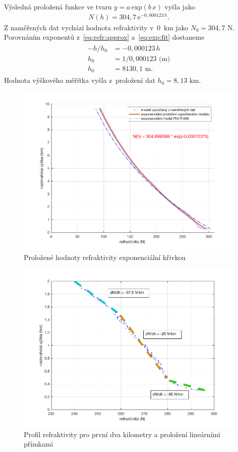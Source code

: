 \documentclass[twoside]{ctuthesis}
\newcommand{\mt}[1]{\text{#1}}
\theoremstyle{plain}
\theoremstyle{definition}
\theoremstyle{note}
\begin{document}
	Výsledná proložená funkce ve tvaru $y=a\,\mt{exp}(b\,x)$ vyšla jako
	\begin{align}
		N(h) = 304{,}7\,\mt{e}^{-0{,}000123\,h}.
		\label{eq:exp:fit}
	\end{align}
	Z naměřených dat vychází hodnota refraktivity v~0~km jako $N_\mt{0} = 304{,}7 \mt{ N}$. Porovnáním exponentů z~\eqref{eq:refr:approx} a~\eqref{eq:exp:fit} dostaneme
	\begin{align}
		\begin{split}
		-h/h_\mt{0} &= -0{,}000123\,h\\
		h_\mt{0} &= 1/0{,}000123 \mt{ (m)}\\
		h_\mt{0} &= 8130{,}1 \mt{ m}.
		\end{split}
	\end{align}
	Hodnota výškového měřítka vyšla z~proložení dat $h_\mt{0} = 8{,}13 \mt{ km}$.
	\begin{figure}[hbtp]
		\centering
		\includegraphics[width=.7\textwidth]{Graphs/refractivity_meas_fit_model.pdf}
		\caption{Proložené hodnoty refraktivity exponenciální křivkou}
		\label{graph:refr:fit}
	\end{figure}

	\begin{figure}
		\centering
		\includegraphics[width=.7\textwidth]{Graphs/N_gradient.pdf}
		\caption{Profil refraktivity pro první dva kilometry a proložení lineárními přímkami}
		\label{graf:refr:2km}
	\end{figure}
\end{document}
